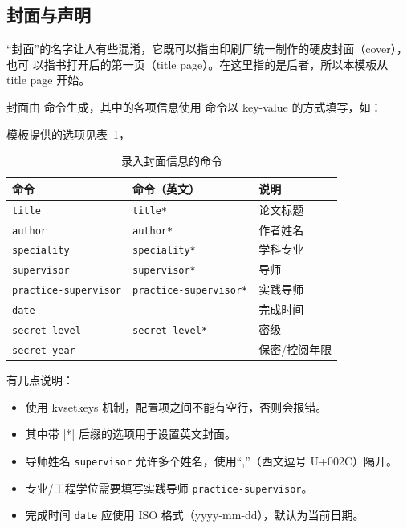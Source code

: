\documentclass[a4paper]{ltxdoc}
\DeclareRobustCommand\pkg{\textsf}
\DeclareRobustCommand\opt{\texttt}
\begin{document}
\subsection{封面与声明}

“封面”的名字让人有些混淆，它既可以指由印刷厂统一制作的硬皮封面（cover），也可
以指书打开后的第一页（title page）。在这里指的是后者，所以本模板从 title page
开始。

\DescribeMacro{\maketitle}
封面由  命令生成，其中的各项信息使用  命令以
key-value 的方式填写，如：
\begin{latex}
\end{latex}
模板提供的选项见表~\ref{tab:covercmds}，
\begin{table}[htb]
  \centering\small
  \caption{录入封面信息的命令}
  \label{tab:covercmds}
  \begin{tabular}{lll}
    \toprule
    命令               & 命令（英文）        & 说明          \\
    \midrule
    \opt{title}        & \opt{title*}        & 论文标题      \\
    \opt{author}       & \opt{author*}       & 作者姓名      \\
    \opt{speciality}   & \opt{speciality*}   & 学科专业      \\
    \opt{supervisor}   & \opt{supervisor*}   & 导师      \\
    \opt{practice-supervisor} & \opt{practice-supervisor*} & 实践导师 \\
    \opt{date}         & -                   & 完成时间      \\
    \opt{secret-level} & \opt{secret-level*} & 密级          \\
    \opt{secret-year}  & -                   & 保密/控阅年限 \\
    \bottomrule
  \end{tabular}
\end{table}

有几点说明：
\begin{itemize}
  \item {} 使用 \pkg{kvsetkeys} 机制，配置项之间不能有空行，否则会报错。
  \item 其中带 |*| 后缀的选项用于设置英文封面。
  \item 导师姓名 \opt{supervisor} 允许多个姓名，使用“,”（西文逗号 U+002C）隔开。
  \item 专业/工程学位需要填写实践导师 \opt{practice-supervisor}。
  \item 完成时间 \opt{date} 应使用 ISO 格式（yyyy-mm-dd），默认为当前日期。
\end{itemize}
\end{document}
